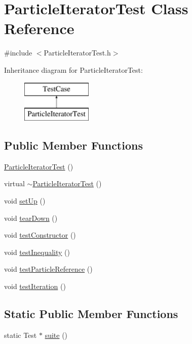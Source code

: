 \hypertarget{classParticleIteratorTest}{\section{Particle\-Iterator\-Test Class Reference}
\label{classParticleIteratorTest}
}


{\ttfamily \#include $<$Particle\-Iterator\-Test.\-h$>$}

Inheritance diagram for Particle\-Iterator\-Test\-:\begin{figure}[H]
\begin{center}
\leavevmode
\includegraphics[height=2.000000cm]{classParticleIteratorTest}
\end{center}
\end{figure}
\subsection*{Public Member Functions}
\begin{DoxyCompactItemize}
\item 
\hyperlink{classParticleIteratorTest_a1dde0a3d917f05b50841ed9d8ea6479d}{Particle\-Iterator\-Test} ()
\item 
virtual \hyperlink{classParticleIteratorTest_acab8f6518b3738e5231fe3eb9fe4a6c3}{$\sim$\-Particle\-Iterator\-Test} ()
\item 
void \hyperlink{classParticleIteratorTest_a3955a83f802919828aa0f53f183ff0b2}{set\-Up} ()
\item 
void \hyperlink{classParticleIteratorTest_a75058ac8ad24eed571ece762eb28c5f1}{tear\-Down} ()
\item 
void \hyperlink{classParticleIteratorTest_a225ec758495ff84c6f0544744d354d56}{test\-Constructor} ()
\item 
void \hyperlink{classParticleIteratorTest_a1c35f2e945298d7767abdfa2ef888f73}{test\-Inequality} ()
\item 
void \hyperlink{classParticleIteratorTest_a6e0546482dce24998d296af47dfd07c1}{test\-Particle\-Reference} ()
\item 
void \hyperlink{classParticleIteratorTest_a115463e0363bbd4211bcc33b534e4373}{test\-Iteration} ()
\end{DoxyCompactItemize}
\subsection*{Static Public Member Functions}
\begin{DoxyCompactItemize}
\item 
static Test $\ast$ \hyperlink{classParticleIteratorTest_a75a4eb66d14bff69b51ccc4f9639c666}{suite} ()
\end{DoxyCompactItemize}
